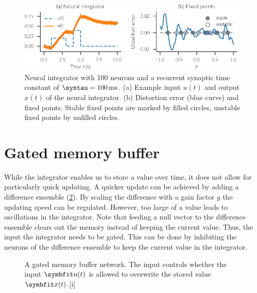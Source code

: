 \begin{figure}
    \centering
    \includegraphics{figures/integrator}
    \caption[Neural integrator.]{Neural integrator with \num{100} neurons and a recurrent synaptic time constant of $\syntau = \SI{100}{\milli\second}$. (a) Example input $u(t)$ and output $x(t)$ of the neural integrator. (b) Distortion error (blue curve) and fixed points. Stable fixed points are marked by filled circles, unstable fixed points by unfilled circles.}\label{fig:integrator}
\end{figure}


\section{Gated memory buffer}
While the integrator enables us to store a value over time, it does not allow for particularly quick updating.
A quicker update can be achieved by adding a difference ensemble (\cref{fig:gated-mem}).
By scaling the difference with a gain factor $g$ the updating speed can be regulated.
However, too large of a value leads to oscillations in the integrator.
Note that feeding a null vector to the difference ensemble clears out the memory instead of keeping the current value.
Thus, the input the integrator needs to be gated.
This can be done by inhibiting the neurons of the difference ensemble to keep the current value in the integrator.
\begin{figure}
    \begin{captionbeside}{A gated memory buffer network. The  input controls whether the input $\vc u(t)$ is allowed to overwrite the stored value $\vc x(t)$.\label{fig:gated-mem}}[i]
\end{captionbeside}
\end{figure}

